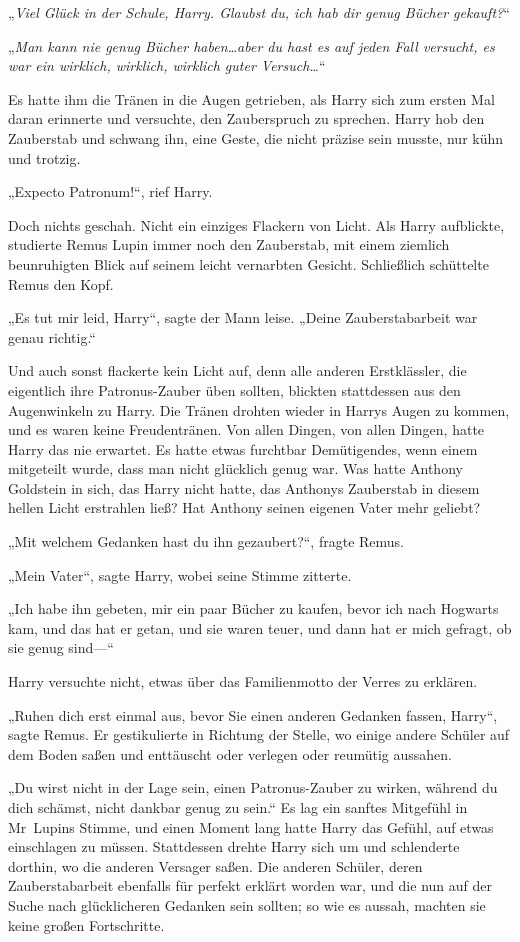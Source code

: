 {„\emph{Viel Glück in der Schule, Harry. Glaubst du, ich hab dir genug Bücher gekauft?}“

„\emph{Man kann nie genug Bücher haben…aber du hast es auf jeden Fall versucht, es war ein wirklich, wirklich, wirklich guter Versuch…}“

Es hatte ihm die Tränen in die Augen getrieben, als Harry sich zum ersten Mal daran erinnerte und versuchte, den Zauberspruch zu sprechen. Harry hob den Zauberstab und schwang ihn, eine Geste, die nicht präzise sein musste, nur kühn und trotzig.

„Expecto Patronum!“, rief Harry.

Doch nichts geschah. Nicht ein einziges Flackern von Licht. Als Harry aufblickte, studierte Remus Lupin immer noch den Zauberstab, mit einem ziemlich beunruhigten Blick auf seinem leicht vernarbten Gesicht. Schließlich schüttelte Remus den Kopf.

„Es tut mir leid, Harry“, sagte der Mann leise. „Deine Zauberstabarbeit war genau richtig.“

Und auch sonst flackerte kein Licht auf, denn alle anderen Erstklässler, die eigentlich ihre Patronus-Zauber üben sollten, blickten stattdessen aus den Augenwinkeln zu Harry. Die Tränen drohten wieder in Harrys Augen zu kommen, und es waren keine Freudentränen. Von allen Dingen, von allen Dingen, hatte Harry das nie erwartet. Es hatte etwas furchtbar Demütigendes, wenn einem mitgeteilt wurde, dass man nicht glücklich genug war. Was hatte Anthony Goldstein in sich, das Harry nicht hatte, das Anthonys Zauberstab in diesem hellen Licht erstrahlen ließ? Hat Anthony seinen eigenen Vater mehr geliebt?

„Mit welchem Gedanken hast du ihn gezaubert?“, fragte Remus.

„Mein Vater“, sagte Harry, wobei seine Stimme zitterte.

„Ich habe ihn gebeten, mir ein paar Bücher zu kaufen, bevor ich nach Hogwarts kam, und das hat er getan, und sie waren teuer, und dann hat er mich gefragt, ob sie genug sind—“

Harry versuchte nicht, etwas über das Familienmotto der Verres zu erklären.

„Ruhen dich erst einmal aus, bevor Sie einen anderen Gedanken fassen, Harry“, sagte Remus. Er gestikulierte in Richtung der Stelle, wo einige andere Schüler auf dem Boden saßen und enttäuscht oder verlegen oder reumütig aussahen.

„Du wirst nicht in der Lage sein, einen Patronus-Zauber zu wirken, während du dich schämst, nicht dankbar genug zu sein.“ Es lag ein sanftes Mitgefühl in Mr~Lupins Stimme, und einen Moment lang hatte Harry das Gefühl, auf etwas einschlagen zu müssen. Stattdessen drehte Harry sich um und schlenderte dorthin, wo die anderen Versager saßen. Die anderen Schüler, deren Zauberstabarbeit ebenfalls für perfekt erklärt worden war, und die nun auf der Suche nach glücklicheren Gedanken sein sollten; so wie es aussah, machten sie keine großen Fortschritte.

}
